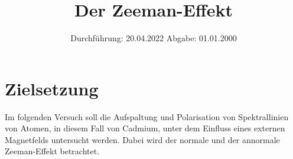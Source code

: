 

\subject{V27}
\title{Der Zeeman-Effekt}
\date{
    Durchführung: 20.04.2022
     \hspace{3em}
    Abgabe: 01.01.2000
}


\maketitle
\thispagestyle{empty}
\tableofcontents
\newpage

\section{Zielsetzung}

    Im folgenden Versuch soll die Aufspaltung und Polarisation von Spektrallinien von Atomen,
    in diesem Fall von Cadmium,
    unter dem Einfluss eines externen Magnetfelds untersucht werden.
    Dabei wird der normale und der annormale Zeeman-Effekt betrachtet.


\clearpage


\clearpage


\clearpage


\clearpage

\printbibliography


